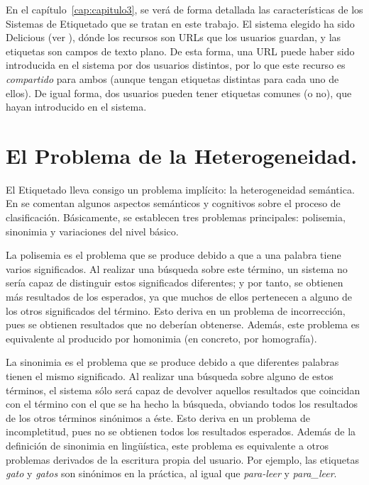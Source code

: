 En el capítulo~\ref{cap:capitulo3}, se verá de forma detallada las características de los Sistemas de Etiquetado que se tratan en este trabajo. El sistema elegido ha sido Delicious (ver \cite{delicious}), dónde los recursos son URLs que los usuarios guardan, y las etiquetas son campos de texto plano. De esta forma, una URL puede haber sido introducida en el sistema por dos usuarios distintos, por lo que este recurso es \emph{compartido} para ambos (aunque tengan etiquetas distintas para cada uno de ellos). De igual forma, dos usuarios pueden tener etiquetas comunes (o no), que hayan introducido en el sistema.




\section{El Problema de la Heterogeneidad.}

El Etiquetado lleva consigo un problema implícito: la heterogeneidad semántica. En \cite{golder} se comentan algunos aspectos semánticos y cognitivos sobre el proceso de clasificación. Básicamente, se establecen tres problemas principales: polisemia, sinonimia y variaciones del nivel básico.

La polisemia es el problema que se produce debido a que a una palabra tiene varios significados. Al realizar una búsqueda sobre este término, un sistema no sería capaz de distinguir estos significados diferentes; y por tanto, se obtienen más resultados de los esperados, ya que muchos de ellos pertenecen a alguno de los otros significados del término. Esto deriva en un problema de incorrección, pues se obtienen resultados que no deberían obtenerse. Además, este problema es equivalente al producido por homonimia (en concreto, por homografía).

La sinonimia es el problema que se produce debido a que diferentes palabras tienen el mismo significado. Al realizar una búsqueda sobre alguno de estos términos, el sistema sólo será capaz de devolver aquellos resultados que coincidan con el término con el que se ha hecho la búsqueda, obviando todos los resultados de los otros términos sinónimos a éste. Esto deriva en un problema de incompletitud, pues no se obtienen todos los resultados esperados. Además de la definición de sinonimia en lingüística, este problema es equivalente a otros problemas derivados de la escritura propia del usuario. Por ejemplo, las etiquetas \emph{gato} y \emph{gatos} son sinónimos en la práctica, al igual que \emph{para-leer} y \emph{para\_leer}.

